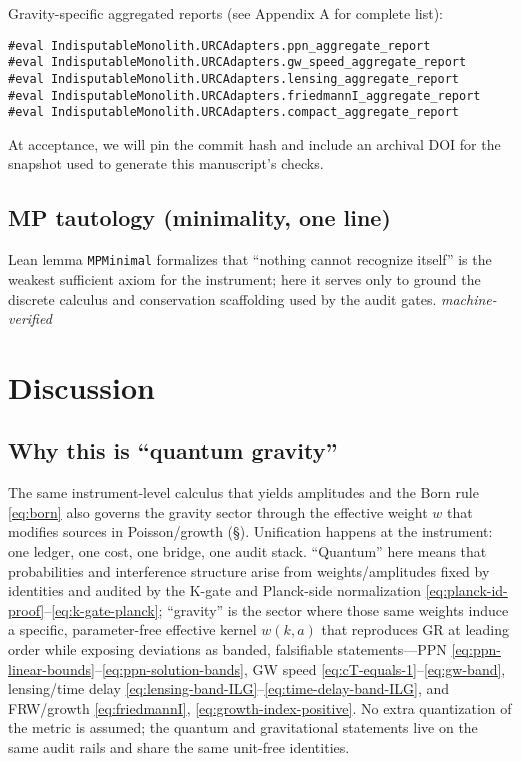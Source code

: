 \documentclass[12pt,a4paper]{article}
\begin{document}
Gravity-specific aggregated reports (see Appendix A for complete list):
\begin{verbatim}
#eval IndisputableMonolith.URCAdapters.ppn_aggregate_report
#eval IndisputableMonolith.URCAdapters.gw_speed_aggregate_report
#eval IndisputableMonolith.URCAdapters.lensing_aggregate_report
#eval IndisputableMonolith.URCAdapters.friedmannI_aggregate_report
#eval IndisputableMonolith.URCAdapters.compact_aggregate_report
\end{verbatim}

At acceptance, we will pin the commit hash and include an archival DOI for the snapshot used to generate this manuscript's checks.

\subsection{MP tautology (minimality, one line)}
Lean lemma \texttt{MPMinimal} formalizes that “nothing cannot recognize itself” is the weakest sufficient axiom for the instrument; here it serves only to ground the discrete calculus and conservation scaffolding used by the audit gates. \emph{machine-verified}

\section{Discussion}

\subsection{Why this is ``quantum gravity''}
The same instrument-level calculus that yields amplitudes and the Born rule \eqref{eq:born} also governs the gravity sector through the effective weight \(w\) that modifies sources in Poisson/growth (\S{}). Unification happens at the instrument: one ledger, one cost, one bridge, one audit stack. “Quantum” here means that probabilities and interference structure arise from weights/amplitudes fixed by identities and audited by the K-gate and Planck-side normalization \eqref{eq:planck-id-proof}–\eqref{eq:k-gate-planck}; “gravity” is the sector where those same weights induce a specific, parameter-free effective kernel \(w(k,a)\) that reproduces GR at leading order while exposing deviations as banded, falsifiable statements—PPN \eqref{eq:ppn-linear-bounds}–\eqref{eq:ppn-solution-bands}, GW speed \eqref{eq:cT-equals-1}–\eqref{eq:gw-band}, lensing/time delay \eqref{eq:lensing-band-ILG}–\eqref{eq:time-delay-band-ILG}, and FRW/growth \eqref{eq:friedmannI}, \eqref{eq:growth-index-positive}. No extra quantization of the metric is assumed; the quantum and gravitational statements live on the same audit rails and share the same unit-free identities.
\end{document}
